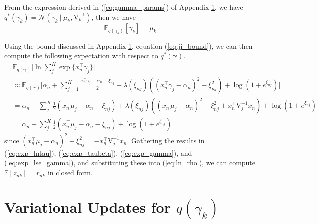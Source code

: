 \documentclass[twoside,11pt]{article}
\newcommand{\tr}{\intercal}
\newcommand\given[1][]{\:#1\vert\:}
\newcommand{\E}{\mathbb{E}}
\begin{document}
From the expression derived in (\ref{eq:gamma_params}) of Appendix \ref{app:gamma}, we have $q^{*}(\gamma_k) = \mathcal{N}(\gamma_k \given \mu_k, \mathrm{V}_k^{-1})$, then we have
\begin{equation} \label{eq:exp_gamma}
	\E_{q(\gamma_k)}[\gamma_k] = \mu_k
\end{equation}

Using the bound discussed in Appendix \ref{app:gamma}, equation (\ref{eq:jj_bound}), we can then compute the following expectation with respect to $q^{*}(\boldsymbol\gamma)$.
\begin{equation} \label{eq:exp_lse_gamma}
\begin{split}
	& \E_{q(\boldsymbol\gamma)} \Bigg[ \ln \sum_{j}^K \exp \{ x_n^{\tr} \gamma_j \} \Bigg] \\
	& \approx \E_{q(\boldsymbol\gamma)} \Bigg[ \alpha_n + \sum_{j = 1}^K \frac{x_n^{\intercal} \gamma_j - \alpha_n - \xi_{nj}}{2} + \lambda(\xi_{nj}) \left( (x_n^{\intercal} \gamma_j - \alpha_n)^2 - \xi_{nj}^2\right) + \log \left( 1 + e^{\xi_{nj}}\right) \Bigg] \\
	& = \alpha_n + \sum_{j}^K \frac{1}{2}\left(x_n^{\tr}\mu_j - \alpha_n - \xi_{nj}\right) + \lambda(\xi_{nj}) \left( (x_n^{\tr} \mu_j - \alpha_n)^2 - \xi_{nj}^2 + x_n^{\tr} \mathrm{V}_j^{-1} x_n \right) + \log( 1 + e^{\xi_{nj}}) \\
	&= \alpha_n + \sum_{j}^K \frac{1}{2}\left(x_n^{\tr}\mu_j - \alpha_n - \xi_{nj}\right) + \log( 1 + e^{\xi_{nj}})
\end{split}
\end{equation}
since $(x_n^{\tr} \mu_j - \alpha_n)^2 - \xi_{nj}^2 = - x_n^{\tr} \mathrm{V}_j^{-1} x_n$. Gathering the results in (\ref{eq:exp_lntau}), (\ref{eq:exp_taubeta}), (\ref{eq:exp_gamma}), and (\ref{eq:exp_lse_gamma}), and substituting these into (\ref{eq:ln_rho}), we can compute $\E[z_{nk}] = r_{nk}$ in closed form. 



\section{Variational Updates for $q(\gamma_k)$} \label{app:gamma}  

\end{document}

